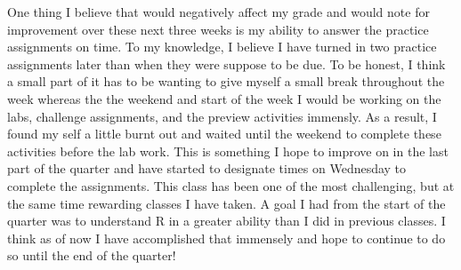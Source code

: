 \documentclass[
  letterpaper,
  DIV=11,
  numbers=noendperiod]{scrartcl}
\begin{document}
One thing I believe that would negatively affect my grade and would note
for improvement over these next three weeks is my ability to answer the
practice assignments on time. To my knowledge, I believe I have turned
in two practice assignments later than when they were suppose to be due.
To be honest, I think a small part of it has to be wanting to give
myself a small break throughout the week whereas the the weekend and
start of the week I would be working on the labs, challenge assignments,
and the preview activities immensly. As a result, I found my self a
little burnt out and waited until the weekend to complete these
activities before the lab work. This is something I hope to improve on
in the last part of the quarter and have started to designate times on
Wednesday to complete the assignments. This class has been one of the
most challenging, but at the same time rewarding classes I have taken. A
goal I had from the start of the quarter was to understand R in a
greater ability than I did in previous classes. I think as of now I have
accomplished that immensely and hope to continue to do so until the end
of the quarter!
\end{document}
